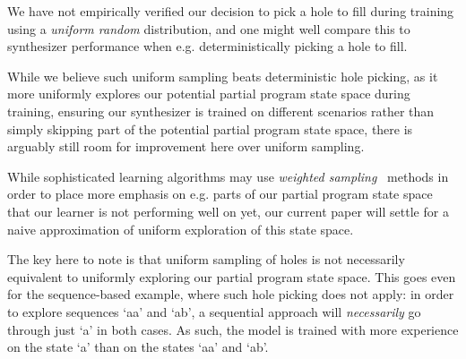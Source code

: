 \documentclass{article}
\begin{document}
We have not empirically verified our decision to pick a hole to fill during training using a \emph{uniform random} distribution,
and one might well compare this to synthesizer performance when e.g. deterministically picking a hole to fill.

While we believe such uniform sampling beats deterministic hole picking,
as it more uniformly explores our potential partial program state space during training,
ensuring our synthesizer is trained on different scenarios rather than simply skipping part of the potential partial program state space,
there is arguably still room for improvement here over uniform sampling.

While sophisticated learning algorithms may use \emph{weighted sampling}~\citep{chen1994weighted}
methods in order to place more emphasis on e.g. parts of our partial program state space that our learner is not performing well on yet,
our current paper will settle for a naive approximation of uniform exploration of this state space.

The key here to note is that uniform sampling of holes is not necessarily equivalent to uniformly exploring our partial program state space.
This goes even for the sequence-based example, where such hole picking does not apply:
in order to explore sequences `aa' and `ab',
a sequential approach will \emph{necessarily} go through just `a' in both cases.
As such, the model is trained with more experience on the state `a' than on the states `aa' and `ab'.
\end{document}
